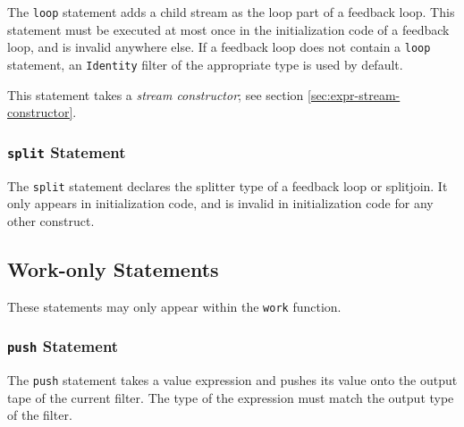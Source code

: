 \documentclass[11pt]{article}
\begin{document}
The \lstinline|loop| statement adds a child stream as the loop part of
a feedback loop.  This statement must be executed at most once in the
initialization code of a feedback loop, and is invalid anywhere else.
If a feedback loop does not contain a \lstinline|loop| statement, an
\lstinline|Identity| filter of the appropriate type is used by
default.

This statement takes a \emph{stream constructor}; see section
\ref{sec:expr-stream-constructor}.

\subsubsection{\lstinline|split| Statement}

The \lstinline|split| statement declares the splitter type of a feedback
loop or splitjoin.  It only appears in initialization code, and is
invalid in initialization code for any other construct.  

\subsection{Work-only Statements}

These statements may only appear within the \lstinline|work| function.

\subsubsection{\lstinline|push| Statement}

The \lstinline|push| statement takes a value expression and pushes its
value onto the output tape of the current filter.  The type of the
expression must match the output type of the filter.


\end{document}
